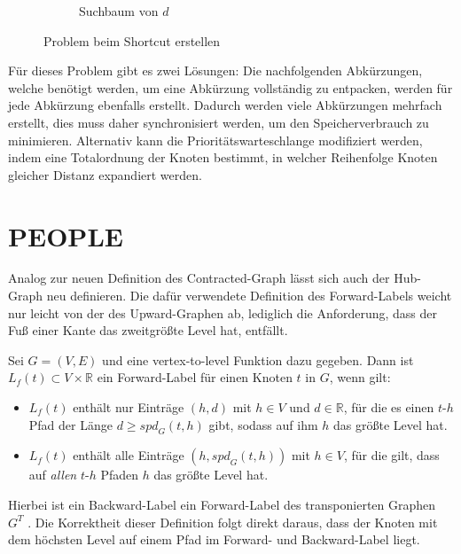 \begin{figure}[h!]
\begin{subfigure}[b]{0.49\textwidth}
    \caption{Suchbaum von $d$}
  \end{subfigure}
  \caption{Problem beim Shortcut erstellen}
  \label{ch:fig:problem_shortcut}
\end{figure}

Für dieses Problem gibt es zwei Lösungen:
Die nachfolgenden Abkürzungen, welche benötigt werden, um eine Abkürzung vollständig zu entpacken, werden für jede Abkürzung ebenfalls erstellt.
Dadurch werden viele Abkürzungen mehrfach erstellt, dies muss daher synchronisiert werden, um den Speicherverbrauch zu minimieren.
Alternativ kann die Prioritätswarteschlange modifiziert werden, indem eine Totalordnung der Knoten bestimmt, in welcher Reihenfolge Knoten gleicher Distanz expandiert werden.

\section{PEOPLE}

Analog zur neuen Definition des Contracted-Graph lässt sich auch der Hub-Graph neu definieren.
Die dafür verwendete Definition des Forward-Labels weicht nur leicht von der des Upward-Graphen ab, lediglich die Anforderung, dass der Fuß einer Kante das zweitgrößte Level hat, entfällt.

\begin{definition}
  Sei $G = (V, E)$ und eine vertex-to-level Funktion dazu gegeben.
  Dann ist $L_f (t) \subset V \times \mathbb{R}$ ein Forward-Label für einen Knoten $t$ in $G$, wenn gilt:

  \begin{itemize}
    \item
          $L_f (t)$ enthält nur Einträge $(h, d)$ mit $h \in V$ und $d \in \mathbb{R}$, für die es einen $t$-$h$ Pfad der Länge $d \geq {spd}_G (t, h)$ gibt, sodass auf ihm $h$ das größte Level hat.

    \item
          $L_f (t)$ enthält alle Einträge $(h, {spd}_G (t, h))$ mit $h \in V$, für die gilt, dass auf \emph{allen} $t$-$h$ Pfaden $h$ das größte Level hat.
  \end{itemize}
\end{definition}


Hierbei ist ein Backward-Label ein Forward-Label des transponierten Graphen $G^T$ .
Die Korrektheit dieser Definition folgt direkt daraus, dass der Knoten mit dem höchsten Level auf einem Pfad im Forward- und Backward-Label liegt.

